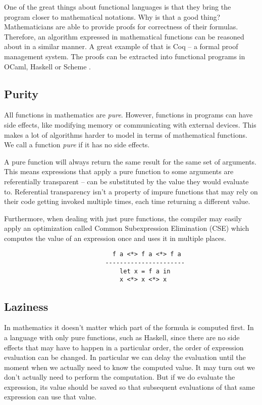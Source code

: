 \documentclass[en]{pracamgr}
\begin{document}
One of the great things about functional languages is that
they bring the program closer to mathematical notations.
Why is that a good thing? Mathematicians are able to
provide proofs for correctness of their formulas. Therefore,
an algorithm expressed in mathematical functions can be
reasoned about in a similar manner.
A great example of that is Coq -- a formal proof management
system. The proofs can be extracted into functional programs
in OCaml, Haskell or Scheme \cite{coq_extract}.

\subsection{Purity}

All functions in mathematics are \textit{pure}. However, functions
in programs can have side effects, like modifying memory or
communicating with external devices. This makes a lot of
algorithms harder to model in terms of mathematical
functions. We call a function \textit{pure} if it has no
side effects.

A pure function will always return the same result for the
same set of arguments. This means expressions that apply a
pure function to some arguments are referentially
transparent \cite{referentialTransparency} -- can be substituted by the value they would
evaluate to. Referential transparency isn't a property of
impure functions that may rely on their code getting
invoked multiple times, each time returning a different
value.

Furthermore, when dealing with just pure functions, the
compiler may easily apply an optimization called Common
Subexpression Elimination (CSE) which computes the value of
an expression once and uses it in multiple places.

\begin{verbatim}
                              f a <*> f a <*> f a
                            ----------------------
                                let x = f a in
                                x <*> x <*> x
\end{verbatim}

\subsection{Laziness}\label{s:laziness}

In mathematics it doesn't matter which part of the formula
is computed first. In a language with only pure functions,
such as Haskell, since there are no side effects that may
have to happen in a particular order, the order of
expression evaluation can be changed. In particular we can
delay the evaluation until the moment when we actually need
to know the computed value. It may turn out we don't
actually need to perform the computation. But if we do
evaluate the expression, its value should be saved so that
subsequent evaluations of that same expression can use that value.
\end{document}
